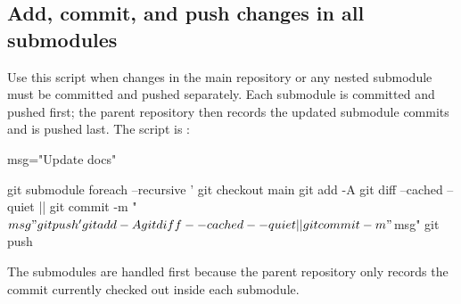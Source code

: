 \subsection*{Add, commit, and push changes in all submodules}
Use this script when changes in the main repository or any nested submodule must be committed and pushed separately.
Each submodule is committed and pushed first; the parent repository then records the updated submodule commits and is pushed last.
The script is :
\begin{DocCode}
msg="Update docs"

git submodule foreach --recursive '
git checkout main
git add -A
git diff --cached --quiet || git commit -m "$msg"
git push
'

git add -A
git diff --cached --quiet || git commit -m "$msg"
git push
\end{DocCode}

The submodules are handled first because the parent repository only records the commit currently checked out inside each submodule.



